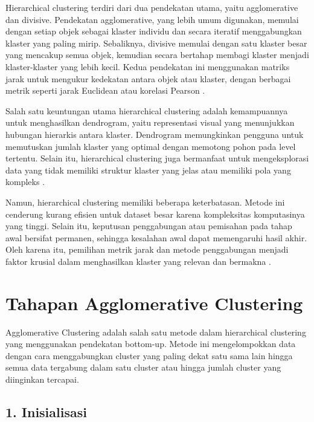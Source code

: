 \documentclass[
  oneside]{book}
\begin{document}
Hierarchical clustering terdiri dari dua pendekatan utama, yaitu agglomerative dan divisive. Pendekatan agglomerative, yang lebih umum digunakan, memulai dengan setiap objek sebagai klaster individu dan secara iteratif menggabungkan klaster yang paling mirip. Sebaliknya, divisive memulai dengan satu klaster besar yang mencakup semua objek, kemudian secara bertahap membagi klaster menjadi klaster-klaster yang lebih kecil. Kedua pendekatan ini menggunakan matriks jarak untuk mengukur kedekatan antara objek atau klaster, dengan berbagai metrik seperti jarak Euclidean atau korelasi Pearson \citep{hartigan1979algorithm}.

Salah satu keuntungan utama hierarchical clustering adalah kemampuannya untuk menghasilkan dendrogram, yaitu representasi visual yang menunjukkan hubungan hierarkis antara klaster. Dendrogram memungkinkan pengguna untuk memutuskan jumlah klaster yang optimal dengan memotong pohon pada level tertentu. Selain itu, hierarchical clustering juga bermanfaat untuk mengeksplorasi data yang tidak memiliki struktur klaster yang jelas atau memiliki pola yang kompleks \citep{sokal1958statistical}.

Namun, hierarchical clustering memiliki beberapa keterbatasan. Metode ini cenderung kurang efisien untuk dataset besar karena kompleksitas komputasinya yang tinggi. Selain itu, keputusan penggabungan atau pemisahan pada tahap awal bersifat permanen, sehingga kesalahan awal dapat memengaruhi hasil akhir. Oleh karena itu, pemilihan metrik jarak dan metode penggabungan menjadi faktor krusial dalam menghasilkan klaster yang relevan dan bermakna \citep{jain2010}.

\section{Tahapan Agglomerative Clustering}\label{tahapan-agglomerative-clustering}

Agglomerative Clustering adalah salah satu metode dalam hierarchical clustering yang menggunakan pendekatan bottom-up. Metode ini mengelompokkan data dengan cara menggabungkan cluster yang paling dekat satu sama lain hingga semua data tergabung dalam satu cluster atau hingga jumlah cluster yang diinginkan tercapai.

\subsection*{1. Inisialisasi}\label{inisialisasi-2}
\end{document}
